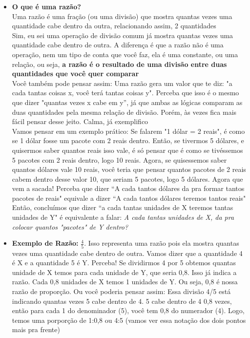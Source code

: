 \documentclass{article}
\begin{document}
\begin{itemize}
    \item \textbf{O que é uma razão?}\\[5pt] Uma razão é uma fração (ou uma divisão) que mostra quantas vezes uma quantidade cabe dentro da outra, relacionando assim, 2 quantidades
    \\[5pt]
    Sim, eu sei uma operação de divisão comum já mostra quantas vezes uma quantidade cabe dentro de outra. A diferença é que a razão não é uma operação, nem um tipo de conta que você faz, ela é uma constante, ou uma relação, ou seja, \textbf{a razão é o resultado de uma divisão entre duas quantidades que você quer comparar}
    \\[5pt]
    Você também pode pensar assim: Uma razão gera um valor que te diz: "a cada tantas coisas x, você terá tantas coisas y". Perceba que isso é o mesmo que dizer "quantas vezes x cabe em y”, já que ambas as lógicas comparam as duas quantidades pela mesma relação de divisão. Porém, às vezes fica mais fácil pensar desse jeito. Calma, já exemplifico
    \\[5pt]
    Vamos pensar em um exemplo prático: Se falarem "1 dólar = 2 reais", é como se 1 dólar fosse um pacote com 2 reais dentro. Então, se tivermos 5 dólares, e quisermos saber quantos reais isso vale, é só pensar que é como se tivéssemos 5 pacotes com 2 reais dentro, logo 10 reais. Agora, se quisessemos saber quantos dólares vale 10 reais, você teria que pensar quantos pacotes de 2 reais cabem dentro desse valor 10, que seriam 5 pacotes, logo 5 dólares. Agora que vem a sacada! Perceba que dizer ``A cada tantos dólares da pra formar tantos pacotes de reais" equivale a dizer ``A cada tantos dólares teremos tantos reais"
    \\[5pt]
    Então, concluímos que dizer ``a cada tantas unidades de X teremos tantas unidades de Y" é equivalente a falar: \textit{A cada tantas unidades de X, da pra colocar quantos "pacotes" de Y dentro?}

    \item \textbf{Exemplo de Razão:} $\frac{4}{5}$. Isso representa uma razão pois ela mostra quantas vezes uma quantidade cabe dentro de outra. Vamos dizer que a quantidade 4 é X e a quantidade 5 é Y. Perceba! Se dividirmos 4 por 5 obtemos quantas unidade de X temos para cada unidade de Y, que seria 0,8. Isso já indica a razão. Cada 0,8 unidades de X temos 1 unidades de Y. Ou seja, 0,8 é nossa razão de proporção. Ou você poderia pensar assim: Essa divisão 4/5 está indicando quantas vezes 5 cabe dentro de 4. 5 cabe dentro de 4 0,8 vezes, então para cada 1 do denominador (5), você tem 0,8 do numerador (4). Logo, temos uma porporção de 1:0,8 ou 4:5 (vamos ver essa notação dos dois pontos mais pra frente)
    

\end{itemize}
\end{document}
